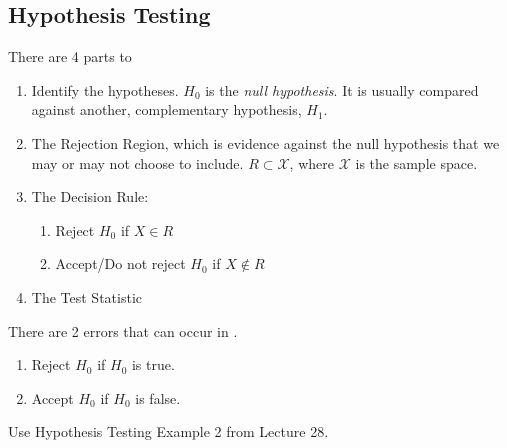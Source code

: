	\subsection{Hypothesis Testing} \label{subsec:Hypothesis Testing}
	There are 4 parts to 
		\begin{enumerate}
			\item Identify the hypotheses. $H_{0}$ is the \emph{null hypothesis}. It is usually compared against another, complementary hypothesis, $H_{1}$.
			\item The Rejection Region, which is evidence against the null hypothesis that we may or may not choose to include. $R \subset \mathcal{X}$, where $\mathcal{X}$ is the sample space.
			\item The Decision Rule:
				\begin{enumerate}
					\item Reject $H_{0}$ if $X \in R$
					\item Accept/Do not reject $H_{0}$ if $X \notin R$
				\end{enumerate}
			\item The Test Statistic
		\end{enumerate}
	There are 2 errors that can occur in .
		\begin{enumerate}[label=\textbf{Type \Roman* Error: }, ref=Hypothesis Testing Type \Roman* Error, align=left, noitemsep, nolistsep]
			\item Reject $H_{0}$ if $H_{0}$ is true.
			\item Accept $H_{0}$ if $H_{0}$ is false.
		\end{enumerate}
		\begin{example}{Use Hypothesis Testing}
			Example 2 from Lecture 28.
		\end{example}